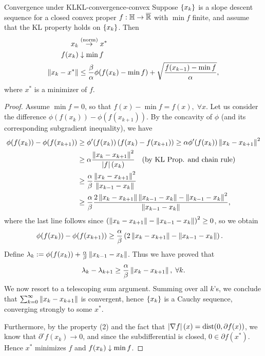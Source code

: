 \begin{ctheorem}{Convergence under KL}{KL-convergence-convex}
	Suppose $\left\{ x_k \right\}$ is a slope descent sequence for a closed convex proper
	$f: \mathbb{H} \to \overline{\mathbb{R}}$ with $\min f$ finite, and assume that the KL
	property holds on $\left\{ x_k \right\}$. Then
	\begin{align*}
		x_k & \overset{\text{(norm)}}{\to} x^* \\
		f(x_k) & \downarrow \min f \\
		\left \| x_k - x^* \right \| &\leq \frac{\beta}{\alpha} \phi(f(x_k) - \min f)
			+ \sqrt{\frac{f(x_{k-1}) - \min f}{\alpha}},
	\end{align*}
	where $x^*$ is a minimizer of $f$.
\end{ctheorem}
\begin{proof}
	Assume $\min f = 0$, so that $f(x) - \min f = f(x), \; \forall x$.
	Let us consider the difference $\phi(f(x_k)) - \phi(f(x_{k+1}))$. By the
	concavity of $\phi$ (and its corresponding subgradient inequality), we have
	\begin{align*}
		\phi(f(x_k)) - \phi(f(x_{k+1})) &\geq \phi'(f(x_k)) \left(
			f(x_k) - f(x_{k+1}) \right) \geq \alpha \phi'(f(x_k))
				\left \| x_k - x_{k+1} \right \|^2 \\
			&\geq \alpha \frac{\left \| x_k - x_{k+1} \right \|^2}{\left|  f  \right|(x_k)}
			 \quad \text{(by KL Prop. and chain rule)} \\
			&\geq \frac{\alpha}{\beta} \frac{\left \| x_k -
			x_{k+1} \right \|^2}{\left \| x_{k-1}
			- x_{k} \right \|} \\
			&\geq \frac{\alpha}{\beta} \frac{2\left \| x_k - x_{k+1} \right \|
			 \left \| x_{k-1} - x_k \right \| - \left \| x_{k-1} - x_k \right \|^2}{
				 \left \| x_{k-1} - x_k \right \|},
	\end{align*}
	where the last line follows since
	\( \left( \left \| x_k - x_{k+1} \right \| - \left \| x_{k-1} - x_k \right \| \right)^2 \geq 0 \),
	so we obtain
	\begin{align*}
		\phi(f(x_k)) - \phi(f(x_{k+1})) &\geq
			\frac{\alpha}{\beta} \left(2 \left \| x_k - x_{k+1} \right \| - \left \| x_{k-1} -
			x_k \right \| \right).
	\end{align*}
	Define $\lambda_k := \phi(f(x_k)) + \frac{\alpha}{\beta} \left \| x_{k-1} -
	x_k \right \|$. Thus we have proved that
	\[
		\lambda_k - \lambda_{k+1} \geq \frac{\alpha}{\beta} \left \| x_k -
		x_{k+1} \right \|, \; \forall k.
	\]
	We now resort to a telescoping sum argument. Summing over all $k$'s, we
	conclude that $\sum_{k=0}^{\infty} \left \| x_k - x_{k+1} \right \|$ is convergent,
	hence $\left\{ x_k \right\}$ is a Cauchy sequence, converging strongly to some $x^*$.

	Furthermore, by the property (2) and the fact that $\left| \nabla f \right|(x) =
	\mathrm{dist}(0, \partial f(x))$, we know that $\partial^{\circ} f(x_k) \to 0$,
	and since the subdifferential is closed, $0 \in \partial f(x^*)$. Hence $x^*$
	minimizes $f$ and $f(x_k) \downarrow \min f$.


\end{proof}
